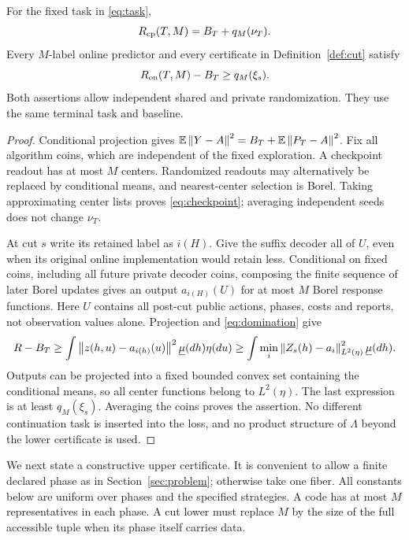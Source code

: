 \begin{lemma}\label{lem:cut}
For the fixed task in \eqref{eq:task},
\begin{equation}\label{eq:checkpoint}
 R_{\mathrm{cp}}(T,M)=B_T+q_M(\nu_T).
\end{equation}
Every $M$-label online predictor and every certificate in Definition~\ref{def:cut} satisfy
\begin{equation}\label{eq:cutlower}
 R_{\mathrm{on}}(T,M)-B_T\ge q_M(\xi_s).
\end{equation}
Both assertions allow independent shared and private randomization. They use the same terminal task and baseline.
\end{lemma}
\begin{proof}
Conditional projection gives $\mathbb E\left\lVert Y-A\right\rVert^2=B_T+\mathbb E\left\lVert P_T-A\right\rVert^2$. Fix all algorithm coins, which are independent of the fixed exploration. A checkpoint readout has at most $M$ centers. Randomized readouts may alternatively be replaced by conditional means, and nearest-center selection is Borel. Taking approximating center lists proves \eqref{eq:checkpoint}; averaging independent seeds does not change $\nu_T$.

At cut $s$ write its retained label as $i(H)$. Give the suffix decoder all of $U$, even when its original online implementation would retain less. Conditional on fixed coins, including all future private decoder coins, composing the finite sequence of later Borel updates gives an output $a_{i(H)}(U)$ for at most $M$ Borel response functions. Here $U$ contains all post-cut public actions, phases, costs and reports, not observation values alone. Projection and \eqref{eq:domination} give
\[
 R-B_T\ge\int\left\lVert z(h,u)-a_{i(h)}(u)\right\rVert^2
                   \underline\mu(dh)\eta(du)
 \ge\int\min_i\left\lVert Z_s(h)-a_i\right\rVert_{L^2(\eta)}^2\underline\mu(dh).
\]
Outputs can be projected into a fixed bounded convex set containing the conditional means, so all center functions belong to $L^2(\eta)$. The last expression is at least $q_M(\xi_s)$. Averaging the coins proves the assertion. No different continuation task is inserted into the loss, and no product structure of $\Lambda$ beyond the lower certificate is used.
\end{proof}

We next state a constructive upper certificate. It is convenient to allow a finite declared phase as in Section~\ref{sec:problem}; otherwise take one fiber. All constants below are uniform over phases and the specified strategies. A code has at most $M$ representatives in each phase. A cut lower must replace $M$ by the size of the full accessible tuple when its phase itself carries data.

